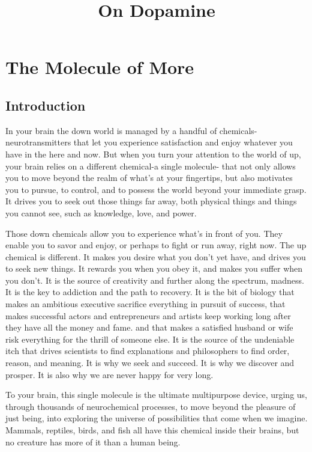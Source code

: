 \documentclass[ebook,12pt,oneside,openany]{memoir}
\begin{document}
\title{On Dopamine}
\maketitle
\section{The Molecule of More}
\subsection{Introduction}
In your brain the down world is managed by a handful of chemicals-neurotransmitters that let you experience
satisfaction and enjoy whatever you have in the here and now.
But when you turn your attention to the world of up, your brain relies on a different chemical-a single molecule-
that not only allows you to move beyond the realm of what's at your fingertips, but also motivates you to pursue, to control,
and to possess the world beyond your immediate grasp.
It drives you to seek out those things far away, both physical things and things you cannot see,
such as knowledge, love, and power. 

Those down chemicals allow you to experience what's in front of you. 
They enable you to savor and enjoy, or perhaps to fight or run away, right now.
The up chemical is different. It makes you desire what you don't yet have,
and drives you to seek new things.
It rewards you when you obey it, and makes you suffer when you don't.
It is the source of creativity and further along the spectrum, madness.
It is the key to addiction and the path to recovery.
It is the bit of biology that makes an ambitious executive sacrifice everything in pursuit of success,
that makes successful actors and entrepreneurs and artists keep working long after they have all the money and fame.
and that makes a satisfied husband or wife risk everything for the thrill of someone else.
It is the source of the undeniable itch that drives scientists to find explanations and philosophers to find order, reason, and meaning.
It is why we seek and succeed. It is why we discover and prosper. It is also why we are never happy for very long.

To your brain, this single molecule is the ultimate multipurpose device, urging us, through thousands of neurochemical processes, 
to move beyond the pleasure of just being, into exploring the universe of possibilities that come when we imagine.
Mammals, reptiles, birds, and fish all have this chemical inside their brains, but no creature has more of it than a human being.
\end{document}
